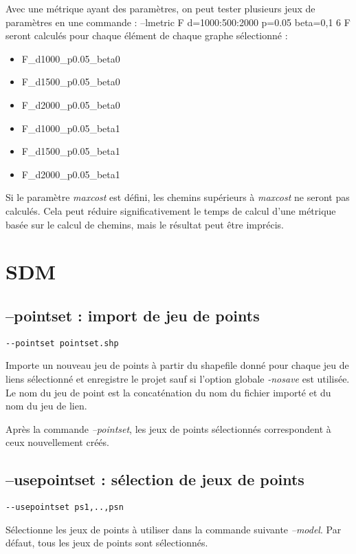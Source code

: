 \documentclass[a4paper,10pt]{report}
\newenvironment{cmd}
{\quote\Verbatim}
{\endVerbatim\endquote}
\begin{document}
Avec une métrique ayant des paramètres, on peut tester plusieurs jeux de paramètres en une commande :
\begin{cmd}
--lmetric F d=1000:500:2000 p=0.05 beta=0,1
\end{cmd}
6 F seront calculés pour chaque élément de chaque graphe sélectionné :
\begin{itemize}
 \item F\_d1000\_p0.05\_beta0
 \item F\_d1500\_p0.05\_beta0
 \item F\_d2000\_p0.05\_beta0
 \item F\_d1000\_p0.05\_beta1
 \item F\_d1500\_p0.05\_beta1
 \item F\_d2000\_p0.05\_beta1
\end{itemize}

Si le paramètre \textit{maxcost} est défini, les chemins supérieurs à \textit{maxcost} ne seront pas calculés. 
Cela peut réduire significativement le temps de calcul d'une métrique basée sur le calcul de chemins, mais le résultat peut être imprécis.

\section{SDM}
\subsection{--pointset : import de jeu de points}
\begin{verbatim}
--pointset pointset.shp
\end{verbatim}
Importe un nouveau jeu de points à partir du shapefile donné pour chaque jeu de liens sélectionné et enregistre le projet sauf si l'option globale \textit{-nosave} est utilisée.
Le nom du jeu de point est la concaténation du nom du fichier importé et du nom du jeu de lien.

Après la commande \textit{--pointset}, les jeux de points sélectionnés correspondent à ceux nouvellement créés.

\subsection{--usepointset : sélection de jeux de points}
\begin{verbatim}
--usepointset ps1,..,psn
\end{verbatim}
Sélectionne les jeux de points à utiliser dans la commande suivante \textit{--model}.
Par défaut, tous les jeux de points sont sélectionnés.
\end{document}
